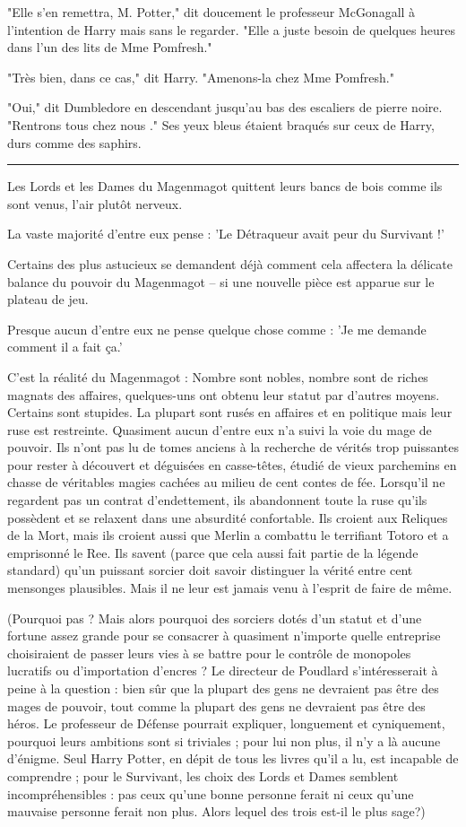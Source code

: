 "Elle s'en remettra, M. Potter," dit doucement le professeur McGonagall à l'intention de Harry mais sans le regarder. "Elle a juste besoin de quelques heures dans l'un des lits de Mme Pomfresh."

"Très bien, dans ce cas," dit Harry. "Amenons-la chez Mme Pomfresh."

"Oui," dit Dumbledore en descendant jusqu'au bas des escaliers de pierre noire. "Rentrons tous chez nous ." Ses yeux bleus étaient braqués sur ceux de Harry, durs comme des saphirs.
\par\noindent\rule{\textwidth}{0.4pt}
Les Lords et les Dames du Magenmagot quittent leurs bancs de bois comme ils sont venus, l'air plutôt nerveux.

La vaste majorité d'entre eux pense : 'Le Détraqueur avait peur du Survivant !'

Certains des plus astucieux se demandent déjà comment cela affectera la délicate balance du pouvoir du Magenmagot – si une nouvelle pièce est apparue sur le plateau de jeu.

Presque aucun d'entre eux ne pense quelque chose comme : 'Je me demande comment il a fait ça.'

C'est la réalité du Magenmagot : Nombre sont nobles, nombre sont de riches magnats des affaires, quelques-uns ont obtenu leur statut par d'autres moyens. Certains sont stupides. La plupart sont rusés en affaires et en politique mais leur ruse est restreinte. Quasiment aucun d'entre eux n'a suivi la voie du mage de pouvoir. Ils n'ont pas lu de tomes anciens à la recherche de vérités trop puissantes pour rester à découvert et déguisées en casse-têtes, étudié de vieux parchemins en chasse de véritables magies cachées au milieu de cent contes de fée. Lorsqu'il ne regardent pas un contrat d'endettement, ils abandonnent toute la ruse qu'ils possèdent et se relaxent dans une absurdité confortable. Ils croient aux Reliques de la Mort, mais ils croient aussi que Merlin a combattu le terrifiant Totoro et a emprisonné le Ree. Ils savent (parce que cela aussi fait partie de la légende standard) qu'un puissant sorcier doit savoir distinguer la vérité entre cent mensonges plausibles. Mais il ne leur est jamais venu à l'esprit de faire de même.

(Pourquoi pas ? Mais alors pourquoi des sorciers dotés d'un statut et d'une fortune assez grande pour se consacrer à quasiment n'importe quelle entreprise choisiraient de passer leurs vies à se battre pour le contrôle de monopoles lucratifs ou d'importation d'encres ? Le directeur de Poudlard s'intéresserait à peine à la question : bien sûr que la plupart des gens ne devraient pas être des mages de pouvoir, tout comme la plupart des gens ne devraient pas être des héros. Le professeur de Défense pourrait expliquer, longuement et cyniquement, pourquoi leurs ambitions sont si triviales ; pour lui non plus, il n'y a là aucune d'énigme. Seul Harry Potter, en dépit de tous les livres qu'il a lu, est incapable de comprendre ; pour le Survivant, les choix des Lords et Dames semblent incompréhensibles : pas ceux qu'une bonne personne ferait ni ceux qu'une mauvaise personne ferait non plus. Alors lequel des trois est-il le plus sage?)

